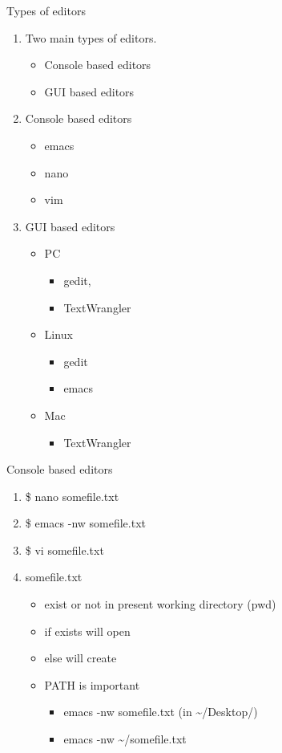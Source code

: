 \documentclass[t,10pt]{beamer}
\begin{document}
\begin{frame}[label={sec:orgheadline7}]{Types of editors}
\begin{enumerate}[<+->]
\item Two main types of editors.
\begin{itemize}
\item Console based editors
\item GUI based editors
\end{itemize}
\item Console based editors
\begin{itemize}
\item emacs
\item nano
\item vim
\end{itemize}
\item GUI based editors
\begin{itemize}
\item PC
\begin{itemize}
\item gedit,
\item TextWrangler
\end{itemize}
\item Linux
\begin{itemize}
\item gedit
\item emacs
\end{itemize}
\item Mac
\begin{itemize}
\item TextWrangler
\end{itemize}
\end{itemize}
\end{enumerate}
\end{frame}
\begin{frame}[label={sec:orgheadline8}]{Console based editors}
\begin{enumerate}[<+->]
\item \$ nano somefile.txt

\item \$ emacs -nw somefile.txt

\item \$ vi somefile.txt

\item somefile.txt 
\begin{itemize}
\item exist or not in present working directory (pwd)
\item if exists will open
\item else will create
\item PATH is important
\begin{itemize}
\item emacs -nw somefile.txt (in \textasciitilde{}/Desktop/)
\item emacs -nw \textasciitilde{}/somefile.txt
\end{itemize}
\end{itemize}
\end{enumerate}
\end{frame}
\end{document}
